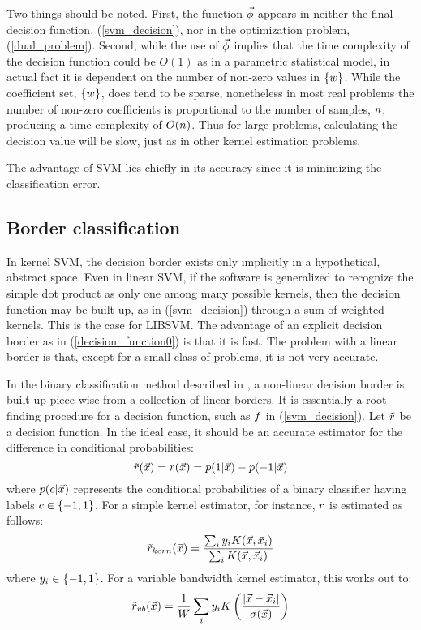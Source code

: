 \documentclass{article}
\begin{document}
Two things should be noted. First, the function $\vec\phi$ appears in
neither the final decision function, (\ref{svm_decision}), nor in the
optimization problem, (\ref{dual_problem}). Second, while the use of
$\vec\phi$ implies that the time complexity of the decision function 
could be $O(1)$ as in a parametric statistical model, in actual fact it is
dependent on the number of non-zero values in $\lbrace w \rbrace$.
While the coefficient set, $\lbrace w \rbrace$, does tend to be sparse,
nonetheless in most real problems the number of non-zero coefficients is
proportional to the number of samples, $n$, producing a time complexity
of $O(n)$. Thus for large problems, calculating the decision value will
be slow, just as in other kernel estimation problems.

The advantage of SVM lies chiefly in its accuracy since it is minimizing the
classification error.

\subsection{Border classification}

In kernel SVM, the decision border exists only implicitly in a hypothetical,
abstract space. Even in linear SVM, if the software is generalized to 
recognize the simple dot product as only one among many possible kernels,
then the decision function may be built up, as in (\ref{svm_decision})
through a sum of weighted kernels. This is the case for LIBSVM.
The advantage of an explicit decision border as in (\ref{decision_function0})
is that it is fast. The problem with a linear border is that, except for a
small class of problems, it is not very accurate.

In the binary classification method described in \citet{Mills2011},
a non-linear decision border is built up piece-wise from a collection of linear borders.
It is essentially a root-finding procedure for a decision function,
such as $f$ in (\ref{svm_decision}).
Let $\tilde r$ be a decision function. In the ideal case, it should
be an accurate estimator for the difference in conditional probabilities:
\begin{equation}
	\tilde r(\vec {x}) = r(\vec {x}) = 
	p(1|\vec {x}) - p(-1|\vec {x})
\end{equation}
where $p(c|\vec {x})$ represents the conditional probabilities of
a binary classifier having labels $c \in \lbrace -1, 1 \rbrace$.
For a simple kernel estimator, for instance, 
$r$ is estimated as follows:
\begin{equation}
	\tilde r_{kern}(\vec {x}) = \frac{\sum_i y_i K(\vec {x}, \vec {x}_i)}{\sum_i K(\vec {x}, \vec {x}_i)}
\end{equation}
where $y_i \in \lbrace -1, 1 \rbrace$.
For a variable bandwidth kernel estimator, this works out to:
\begin{equation}
	\tilde r_{vb}(\vec {x}) = \frac{1}{W} \sum_i y_i K \left (\frac{|\vec {x} - \vec {x}_i|}{\sigma(\vec {x})} \right )
	\label{vb_kernel_r}
\end{equation}
\end{document}
